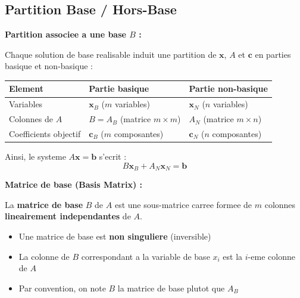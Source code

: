 \documentclass[12pt,a4paper]{article}
\begin{document}
\newpage
\subsection{Partition Base / Hors-Base}

\begin{definition}
\textbf{Partition associee a une base $B$ :}

Chaque solution de base realisable induit une partition de $\mathbf{x}$, $A$ et $\mathbf{c}$ en parties basique et non-basique :

\begin{center}
\begin{tabular}{l|l|l}
\toprule
\textbf{Element} & \textbf{Partie basique} & \textbf{Partie non-basique} \\
\midrule
Variables & $\mathbf{x}_B$ ($m$ variables) & $\mathbf{x}_N$ ($n$ variables) \\
Colonnes de $A$ & $B = A_B$ (matrice $m \times m$) & $A_N$ (matrice $m \times n$) \\
Coefficients objectif & $\mathbf{c}_B$ ($m$ composantes) & $\mathbf{c}_N$ ($n$ composantes) \\
\bottomrule
\end{tabular}
\end{center}

Ainsi, le systeme $A\mathbf{x} = \mathbf{b}$ s'ecrit :
$$B\mathbf{x}_B + A_N\mathbf{x}_N = \mathbf{b}$$
\end{definition}

\begin{definition}
\textbf{Matrice de base (Basis Matrix) :}

La \textcolor{defvert}{\textbf{matrice de base}} $B$ de $A$ est une sous-matrice carree formee de $m$ colonnes \textcolor{algoviolet}{\textbf{lineairement independantes}} de $A$.

\begin{itemize}
    \item Une matrice de base est \textcolor{titrebleu}{\textbf{non singuliere}} (inversible)
    \item La colonne de $B$ correspondant a la variable de base $x_i$ est la $i$-eme colonne de $A$
    \item Par convention, on note $B$ la matrice de base plutot que $A_B$
\end{itemize}
\end{definition}
\end{document}
